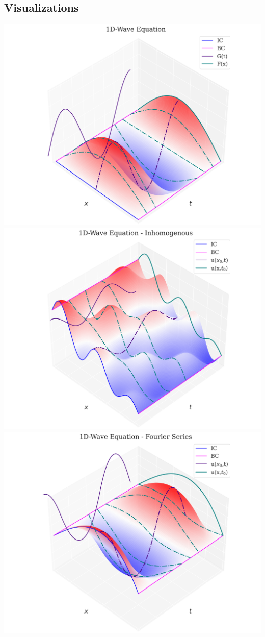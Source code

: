 \subsection{Visualizations}
\includegraphics[width=0.85\linewidth]{../images/1d_wave.png}\\
\includegraphics[width=0.85\linewidth]{../images/1d_wave_inhom.png}\\
\includegraphics[width=0.85\linewidth]{../images/1d_wave_fs.png}\\

